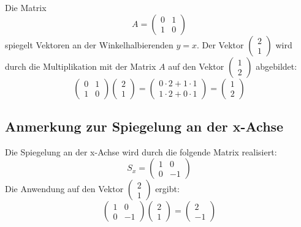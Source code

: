 Die Matrix \[ A = \begin{pmatrix} 0 & 1 \\ 1 & 0 \end{pmatrix} \] spiegelt Vektoren an der Winkelhalbierenden $y=x$. Der Vektor \begin{math}\begin{pmatrix} 2 \\ 1 \end{pmatrix}\end{math} wird durch die Multiplikation mit der Matrix $A$ auf den Vektor \begin{math}\begin{pmatrix} 1 \\ 2 \end{pmatrix}\end{math} abgebildet:
\[ \begin{pmatrix} 0 & 1 \\ 1 & 0 \end{pmatrix} \begin{pmatrix} 2 \\ 1 \end{pmatrix} = \begin{pmatrix} 0 \cdot 2 + 1 \cdot 1 \\ 1 \cdot 2 + 0 \cdot 1 \end{pmatrix} = \begin{pmatrix} 1 \\ 2 \end{pmatrix} \]

\subsection{Anmerkung zur Spiegelung an der x-Achse}
Die Spiegelung an der x-Achse wird durch die folgende Matrix realisiert:
\[ S_x = \begin{pmatrix} 1 & 0 \\ 0 & -1 \end{pmatrix} \]
Die Anwendung auf den Vektor \begin{math}\begin{pmatrix} 2 \\ 1 \end{pmatrix}\end{math} ergibt:
\[ \begin{pmatrix} 1 & 0 \\ 0 & -1 \end{pmatrix} \begin{pmatrix} 2 \\ 1 \end{pmatrix} = \begin{pmatrix} 2 \\ -1 \end{pmatrix} \]

